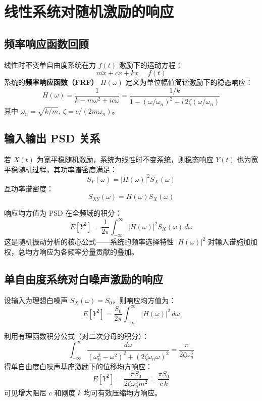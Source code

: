 \section{线性系统对随机激励的响应}
\subsection{频率响应函数回顾}
线性时不变单自由度系统在力 $f(t)$ 激励下的运动方程：
\[
m\ddot{x} + c\dot{x} + kx = f(t)
\]
系统的\textbf{频率响应函数（FRF）} $H(\omega)$ 定义为单位幅值简谐激励下的稳态响应：
\[
H(\omega) = \frac{1}{k - m\omega^{2} + i c\omega} = \frac{1/k}{1 - (\omega/\omega_n)^{2} + i\,2\zeta(\omega/\omega_n)}
\]
其中 $\omega_n = \sqrt{k/m}$, $\zeta = c/(2m\omega_n)$。

\subsection{输入输出 PSD 关系}
\begin{theorem}[随机激励下的传递关系]
若 $X(t)$ 为宽平稳随机激励，系统为线性时不变系统，则稳态响应 $Y(t)$ 也为宽平稳随机过程，其功率谱密度满足：
\[
S_Y(\omega) = |H(\omega)|^{2} S_X(\omega)
\]
互功率谱密度：
\[
S_{XY}(\omega) = H(\omega) S_X(\omega)
\]
\end{theorem}

\begin{myformula}
响应均方值为 PSD 在全频域的积分：
\[
E[Y^{2}] = \frac{1}{2\pi}\int_{-\infty}^{\infty} |H(\omega)|^{2} S_X(\omega)\,d\omega
\]
这是随机振动分析的核心公式——系统的频率选择特性 $|H(\omega)|^{2}$ 对输入谱施加加权，总均方响应为各频率分量贡献的叠加。
\end{myformula}

\subsection{单自由度系统对白噪声激励的响应}
设输入为理想白噪声 $S_X(\omega) = S_0$，则响应均方值为：
\[
E[Y^{2}] = \frac{S_0}{2\pi}\int_{-\infty}^{\infty} |H(\omega)|^{2}\,d\omega
\]

\begin{myformula}
利用有理函数积分公式（对二次分母的积分）：
\[
\int_{-\infty}^{\infty} \frac{d\omega}{(\omega_n^{2} - \omega^{2})^{2} + (2\zeta\omega_n\omega)^{2}} = \frac{\pi}{2\zeta\omega_n^{3}}
\]
得单自由度白噪声基座激励下的位移均方响应：
\[
E[Y^{2}] = \frac{\pi S_0}{2\zeta\omega_n^{3} m^{2}} = \frac{\pi S_0}{c\,k}
\]
可见增大阻尼 $c$ 和刚度 $k$ 均可有效压缩均方响应。
\end{myformula}

